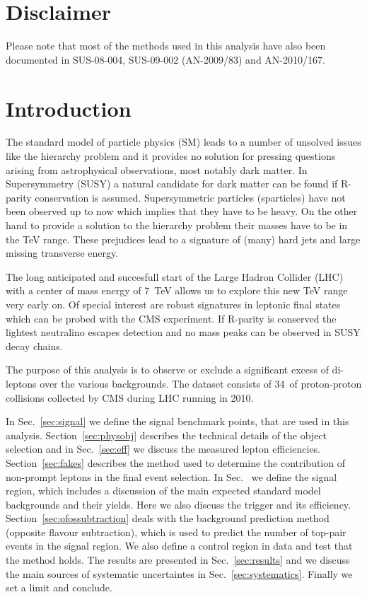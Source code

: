 \section{Disclaimer}

Please note that most of the methods used in this analysis have also been documented in SUS-08-004,
SUS-09-002 (AN-2009/83) and AN-2010/167.

\section{Introduction}

The standard model of particle physics (SM) leads to a number of unsolved issues like the 
hierarchy problem and it provides no solution for pressing questions arising from astrophysical 
observations, most notably dark matter. In Supersymmetry (SUSY) a natural candidate for dark matter 
can be found if R-parity conservation is assumed. Supersymmetric particles (sparticles) have not 
been observed up to now which implies that they have to be heavy. 
On the other hand to provide a solution to the hierarchy problem their masses have to be in the TeV range.
These prejudices lead to a signature of (many) hard jets and large missing transverse energy.

The long anticipated and succesfull start of the Large Hadron Collider (LHC) with a center of mass energy of 7~TeV 
allows us to explore this new TeV range very early on. 
Of special interest are robust signatures in leptonic final states which can be probed with the CMS experiment.
If R-parity is conserved the lightest neutralino escapes detection and no mass peaks can be observed 
in SUSY decay chains. 

The purpose of this analysis is to observe or exclude a significant excess of di-leptons 
over the various backgrounds.
The dataset consists of 34~\pbi of proton-proton collisions collected by CMS during LHC
running in 2010.

In Sec.~\ref{sec:signal} we define the signal benchmark points, that are used in this analysis.
Section~\ref{sec:physobj} describes the technical details of the object selection
and in Sec.~\ref{sec:eff} we discuss the measured lepton efficiencies.
Section~\ref{sec:fakes} describes the method used to determine the contribution
of non-prompt leptons in the final event selection.
In Sec.~\label{sec:eventselection} we define the signal region, which includes a discussion of the main
expected standard model backgrounds and their yields. Here we also discuss the trigger and its efficiency.
Section~\ref{sec:ofossubtraction} deals with the background prediction method (opposite flavour subtraction),
which is used to predict the number of top-pair events in the signal region. We also define a control
region in data and test that the method holds.
The results are presented in Sec.~\ref{sec:results} and we discuss the main sources of systematic
uncertaintes in Sec.~\ref{sec:systematics}. Finally we set a limit and conclude.
